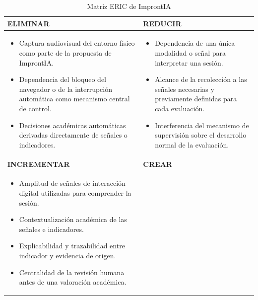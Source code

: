 \begin{table}[h!]
    \caption{Matriz ERIC de ImprontIA}
    \label{tab:matriz_eric}
    \centering
    \small
    \begin{tabularx}{\textwidth}{X X}
        \toprule
        \rowcolor{accent!15}\textbf{ELIMINAR} & \textbf{REDUCIR} \\
        \midrule
        \begin{minipage}[t]{\linewidth}
        \begin{itemize}[leftmargin=1em]
            \item Captura audiovisual del entorno físico como parte de la propuesta de ImprontIA.
            \item Dependencia del bloqueo del navegador o de la interrupción automática como mecanismo central de control.
            \item Decisiones académicas automáticas derivadas directamente de señales o indicadores.
        \end{itemize}
        \end{minipage}
        &
        \begin{minipage}[t]{\linewidth}
        \begin{itemize}[leftmargin=1em]
            \item Dependencia de una única modalidad o señal para interpretar una sesión.
            \item Alcance de la recolección a las señales necesarias y previamente definidas para cada evaluación.
            \item Interferencia del mecanismo de supervisión sobre el desarrollo normal de la evaluación.
        \end{itemize}
        \end{minipage} \\
        \addlinespace[6pt]
        \rowcolor{accent!15}\textbf{INCREMENTAR} & \textbf{CREAR} \\
        \midrule
        \begin{minipage}[t]{\linewidth}
        \begin{itemize}[leftmargin=1em]
            \item Amplitud de señales de interacción digital utilizadas para comprender la sesión.
            \item Contextualización académica de las señales e indicadores.
            \item Explicabilidad y trazabilidad entre indicador y evidencia de origen.
            \item Centralidad de la revisión humana antes de una valoración académica.

\end{itemize}
\end{minipage}
\end{tabularx}
\end{table}
